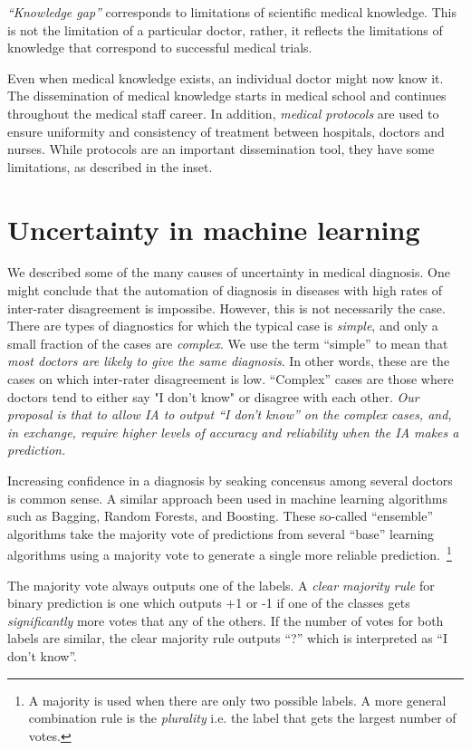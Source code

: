 \documentclass[11pt]{pnas-new}
\begin{document}
{\em ``Knowledge gap''} corresponds to limitations of scientific medical
knowledge. This is not the limitation of a particular doctor, rather,
it reflects the limitations of knowledge that correspond to successful
medical trials.


Even when medical knowledge exists, an individual doctor might now
know it. The dissemination of medical knowledge starts in medical
school and continues throughout the medical staff career. In addition,
{\em medical protocols} are used to ensure uniformity and
consistency of treatment between hospitals, doctors and nurses. While
protocols are an important dissemination tool, they have some limitations, 
as described in the inset.
~\\

\section{Uncertainty in machine learning}

We described some of the many causes of uncertainty in medical
diagnosis. One might conclude that the automation of diagnosis in
diseases with high rates of inter-rater disagreement is
impossibe. However, this is not necessarily the case. There are types
of diagnostics for which the typical case is {\em simple}, and only a
small fraction of the cases are {\em complex}.  We use the term
``simple'' to mean that {\em most doctors are likely to give the same
  diagnosis}.  In other words, these are the cases on which
inter-rater disagreement is low. ``Complex'' cases are those where
doctors tend to either say "I don't know" or disagree with each other.
{\em Our proposal is that to allow IA to output ``I don't know'' on
  the complex cases, and, in exchange, require higher levels of
  accuracy and reliability when the IA makes a prediction.}

Increasing confidence in a diagnosis by seaking concensus among
several doctors is common sense. A similar approach  been
used in machine learning algorithms such as Bagging, Random Forests, and
Boosting\cite{}. These so-called ``ensemble'' algorithms take the
majority vote of predictions from several ``base'' learning algorithms using a majority
vote to generate a single more reliable prediction.~\footnote{A majority is
  used when there are only two possible labels. A more general
  combination rule is the {\em plurality} i.e. the label that gets the
  largest number of votes.}

The majority vote always outputs one of the labels. A {\em clear
  majority rule} for binary prediction is one which outputs +1 or -1
if one of the classes gets {\em significantly} more votes that any of
the others. If the number of votes for both labels are similar, the
clear majority rule outputs ``?'' which is interpreted as ``I don't
know''.
\end{document}
